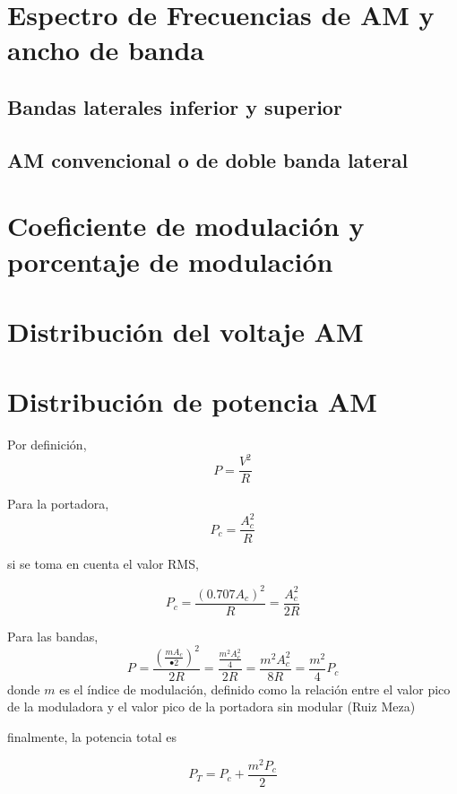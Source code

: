 \documentclass[12pt,letterpaper,titlepage,twoside]{book}
\begin{document}
\section{Espectro de Frecuencias de AM y ancho de banda}
\subsection{Bandas laterales inferior y superior}
\subsection{AM convencional o de doble banda lateral}
\section{Coeficiente de modulación y porcentaje de modulación}
\section{Distribución del voltaje AM}
\section{Distribución de potencia AM}

Por definición, 
\begin{equation}
P = \frac{V^2}{R}
\end{equation}

Para la portadora, 
\begin{equation}
P_c = \frac{A_c^2}{R}
\end{equation}

si se toma en cuenta el valor RMS, 

\begin{equation}
P_c = \frac{\left( 0.707 A_c\right)^2}{R}=\frac{A_c^2}{2R}
\end{equation}


Para las bandas,
\begin{equation}
P_{} = \frac{\left( \frac{ mA_c}{•2} \right)^2}{2R} = \frac{\frac{m^2 A_c^2}{4}}{2R} = \frac{m^2A_c^2}{8R}= \frac{m^2}{4}P_c
\end{equation}
donde $m$ es el índice de modulación, definido como la relación entre el valor pico de la moduladora y el valor pico de la portadora sin modular (Ruiz Meza)


finalmente, la potencia total es

\begin{equation}
P_T = P_c + \frac{m^2 P_c}{2}
\end{equation}
\end{document}
